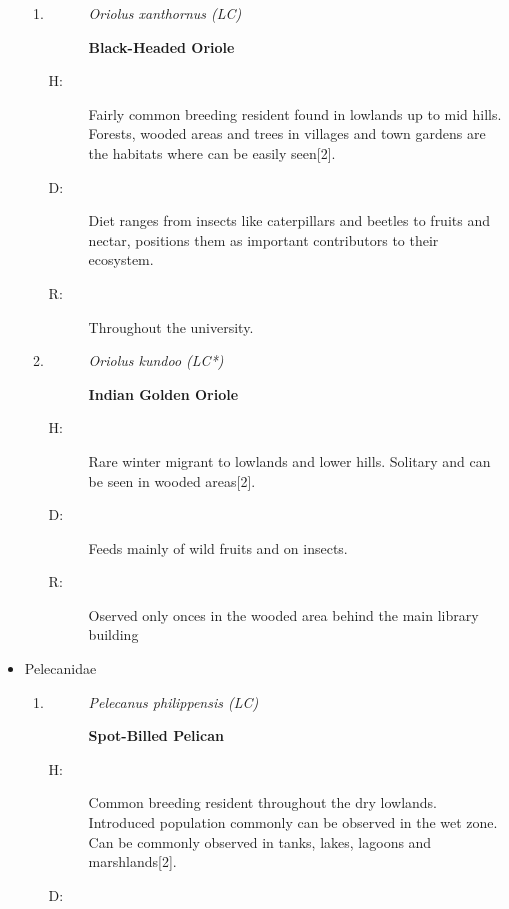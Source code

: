 \begin{itemize}
\begin{enumerate}
\item%
\begin{description}%
\item[]%
\textit{Oriolus xanthornus (LC)}%
\item[]%
\textbf{Black{-}Headed Oriole}%
\end{description}%
\begin{description}%
\item[H: ]%
Fairly common breeding resident found in lowlands up to mid hills. Forests, wooded areas and trees in villages and town gardens are the habitats where can be easily seen{[}2{]}.%
\item[D: ]%
Diet ranges from insects like caterpillars and beetles to fruits and nectar, positions them as important contributors to their ecosystem.%
\item[R: ]%
Throughout the university.%
\end{description}%
\item%
\begin{description}%
\item[]%
\textit{Oriolus kundoo (LC*)}%
\item[]%
\textbf{Indian Golden Oriole}%
\end{description}%
\begin{description}%
\item[H: ]%
Rare winter migrant to lowlands and lower hills. Solitary and can be seen in wooded areas{[}2{]}.%
\item[D: ]%
Feeds mainly of wild fruits and on insects. %
\item[R: ]%
Oserved only onces in the wooded area behind the main library building%
\end{description}%
\end{enumerate}%
\item%
Pelecanidae%
\begin{enumerate}%
\item%
\begin{description}%
\item[]%
\textit{Pelecanus philippensis (LC)}%
\item[]%
\textbf{Spot{-}Billed Pelican}%
\end{description}%
\begin{description}%
\item[H: ]%
Common breeding resident throughout the dry lowlands. Introduced population commonly can be observed in the wet zone.  Can be commonly observed in tanks, lakes, lagoons and marshlands{[}2{]}.%
\item[D: ]%

\end{description}
\end{enumerate}
\end{itemize}
